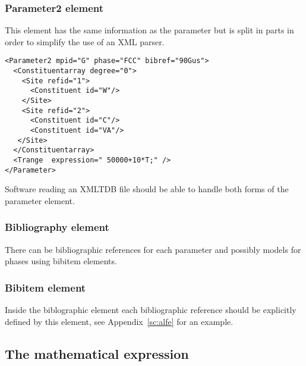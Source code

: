 \documentclass[12pt]{article}
\begin{document}
\begin{appendices}
\subsubsection{Parameter2 element}\label{sc:parserpar}

This element has the same information as the parameter but is split in
parts in order to simplify the use of an XML parser.

\begin{verbatim}
<Parameter2 mpid="G" phase="FCC" bibref="90Gus">
  <Constituentarray degree="0">
    <Site refid="1">
      <Constituent id="W"/>
    </Site>
    <Site refid="2">
      <Constituent id="C"/>
      <Constituent id="VA"/>
   </Site>
  </Constituentarray>
  <Trange  expression=" 50000+10*T;" />
</Parameter>
\end{verbatim}

Software reading an XMLTDB file should be able to handle both forms of
the parameter element.

\subsubsection{Bibliography element}

There can be bibliographic references for each parameter and possibly
models for phases using bibitem elements.

\subsubsection{Bibitem element}

Inside the biblographic element each bibliographic reference should be
explicitly defined by this element, see Appendix~\ref{sc:alfe} for an
example.

\subsection{The mathematical expression}\label{sc:expression}


\end{appendices}
\end{document}

